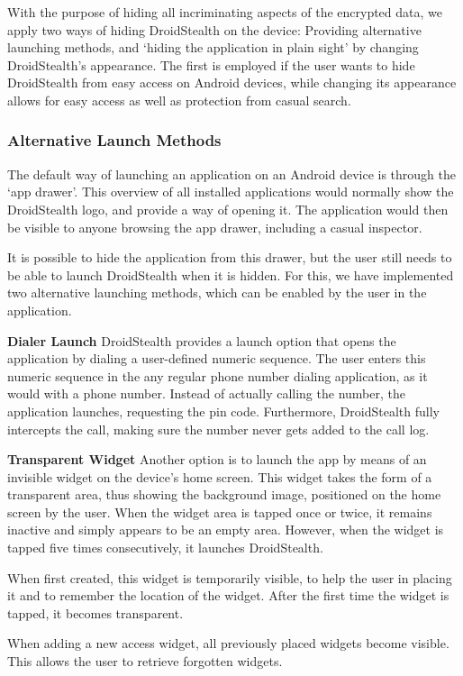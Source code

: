 With the purpose of hiding all incriminating aspects of the encrypted data, we apply two ways of hiding DroidStealth on the device: 
Providing alternative launching methods, and `hiding the application in plain sight' by changing DroidStealth's appearance. 
The first is employed if the user wants to hide DroidStealth from easy access on Android devices, while changing its appearance allows for easy access as well as protection from casual search.

\subsubsection{Alternative Launch Methods}
The default way of launching an application on an Android device is through the `app drawer'.
This overview of all installed applications would normally show the DroidStealth logo, and provide a way of opening it.
The application would then be visible to anyone browsing the app drawer, including a casual inspector.

It is possible to hide the application from this drawer, but the user still needs to be able to launch DroidStealth when it is hidden.
For this, we have implemented two alternative launching methods, which can be enabled by the user in the application.

\textbf{Dialer Launch}
DroidStealth provides a launch option that opens the application by dialing a user-defined numeric sequence. 
The user enters this numeric sequence in the any regular phone number dialing application, as it would with a phone number.
Instead of actually calling the number, the application launches, requesting the pin code. 
Furthermore, DroidStealth fully intercepts the call, making sure the number never gets added to the call log.

\textbf{Transparent Widget}
Another option is to launch the app by means of an invisible widget on the device's home screen. 
This widget takes the form of a transparent area, thus showing the background image, positioned on the home screen by the user.
When the widget area is tapped once or twice, it remains inactive and simply appears to be an empty area.
However, when the widget is tapped five times consecutively, it launches DroidStealth.

When first created, this widget is temporarily visible, to help the user in placing it and to remember the location of the widget.
After the first time the widget is tapped, it becomes transparent.

When adding a new access widget, all previously placed widgets become visible. 
This allows the user to retrieve forgotten widgets. 

